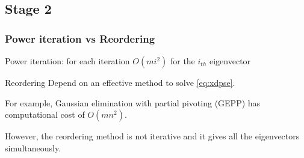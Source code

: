 \documentclass[mathserif, handout]{beamer}
\begin{document}
\subsection{Stage 2}
\begin{frame}
  \frametitle{Power iteration vs Reordering}

  \begin{block}{Power iteration: for each iteration}
     $O(mi^{2})$ for the $i_{th}$ eigenvector
  \end{block}

  \pause

  \begin{block}{Reordering}
    Depend on an effective method to solve \textbf{\pse} \eqref{eq:xdpse}.
    \vspace{0em}

    For
    example, {\color{cyan} Gaussian  elimination with partial pivoting} (GEPP)
    has computational cost of $O(mn^{2})$.
  \end{block}

  \pause

  However,  the reordering method is {\color{red} not iterative} and
  it gives all the eigenvectors {\color{red} simultaneously}.
\end{frame}
\end{document}
